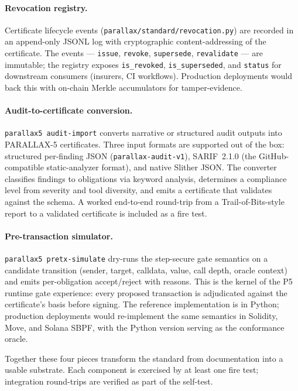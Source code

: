 \documentclass[11pt,a4paper]{article}
\begin{document}
\paragraph{Revocation registry.}
Certificate lifecycle events (\texttt{parallax/standard/revocation.py}) are recorded in an append-only JSONL log with cryptographic content-addressing of the certificate. The events --- \texttt{issue}, \texttt{revoke}, \texttt{supersede}, \texttt{revalidate} --- are immutable; the registry exposes \texttt{is\_revoked}, \texttt{is\_superseded}, and \texttt{status} for downstream consumers (insurers, CI workflows). Production deployments would back this with on-chain Merkle accumulators for tamper-evidence.

\paragraph{Audit-to-certificate conversion.}
\texttt{parallax5 audit-import} converts narrative or structured audit outputs into PARALLAX-5 certificates. Three input formats are supported out of the box: structured per-finding JSON (\texttt{parallax-audit-v1}), SARIF~2.1.0 (the GitHub-compatible static-analyzer format), and native Slither JSON. The converter classifies findings to obligations via keyword analysis, determines a compliance level from severity and tool diversity, and emits a certificate that validates against the schema. A worked end-to-end round-trip from a Trail-of-Bits-style report to a validated certificate is included as a fire test.

\paragraph{Pre-transaction simulator.}
\texttt{parallax5 pretx-simulate} dry-runs the step-secure gate semantics on a candidate transition (sender, target, calldata, value, call depth, oracle context) and emits per-obligation accept/reject with reasons. This is the kernel of the P5 runtime gate experience: every proposed transaction is adjudicated against the certificate's basis before signing. The reference implementation is in Python; production deployments would re-implement the same semantics in Solidity, Move, and Solana SBPF, with the Python version serving as the conformance oracle.

Together these four pieces transform the standard from documentation into a usable substrate. Each component is exercised by at least one fire test; integration round-trips are verified as part of the self-test.
\end{document}
